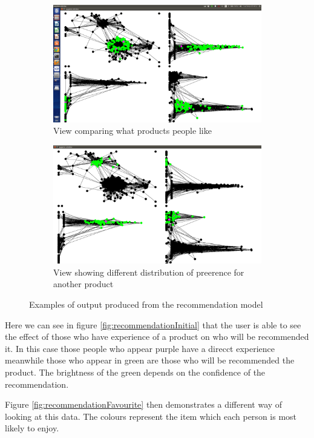 \documentclass[12pt,a4paper]{article}
\begin{document}
\begin{figure}[htb]
\begin{subfigure}[b]{0.4\linewidth}
	\caption{View comparing what products people like}
	\label{fig:recommendationComparison}
	\includegraphics[scale=0.1]{Recommendation3.png}
	\end{subfigure}
\quad
	\begin{subfigure}[b]{0.4\linewidth}
	\caption{View showing different distribution of preerence for another product}
	\label{fig:recommendationDifferent}
	\includegraphics[scale=0.1]{Recommendation4.png}
	\end{subfigure}
\caption{Examples of output produced from the recommendation model}
\label{fig:recommendation}
\end{figure}

Here we can see in figure \ref{fig:recommendationInitial} that the user is able to see the effect of those who have experience of a product on who will be recommended it. In this case those people who appear purple have a direcct experience meanwhile those who appear in green are those who will be recommended the product. The brightness of the green depends on the confidence of the recommendation.

Figure \ref{fig:recommendationFavourite} then demonstrates a different way of looking at this data. The colours represent the item which each person is most likely to enjoy.
\end{document}
